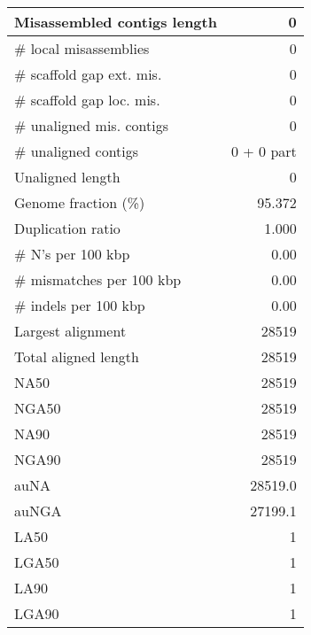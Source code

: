 \documentclass[12pt,a4paper]{article}
\begin{document}
\begin{table}[ht]
\begin{center}
\begin{tabular}{|l*{1}{|r}|}
Misassembled contigs length & 0 \\ \hline
\# local misassemblies & 0 \\ \hline
\# scaffold gap ext. mis. & 0 \\ \hline
\# scaffold gap loc. mis. & 0 \\ \hline
\# unaligned mis. contigs & 0 \\ \hline
\# unaligned contigs & 0 + 0 part \\ \hline
Unaligned length & 0 \\ \hline
Genome fraction (\%) & 95.372 \\ \hline
Duplication ratio & 1.000 \\ \hline
\# N's per 100 kbp & 0.00 \\ \hline
\# mismatches per 100 kbp & 0.00 \\ \hline
\# indels per 100 kbp & 0.00 \\ \hline
Largest alignment & 28519 \\ \hline
Total aligned length & 28519 \\ \hline
NA50 & 28519 \\ \hline
NGA50 & 28519 \\ \hline
NA90 & 28519 \\ \hline
NGA90 & 28519 \\ \hline
auNA & 28519.0 \\ \hline
auNGA & 27199.1 \\ \hline
LA50 & 1 \\ \hline
LGA50 & 1 \\ \hline
LA90 & 1 \\ \hline
LGA90 & 1 \\ \hline
\end{tabular}
\end{center}
\end{table}
\end{document}
